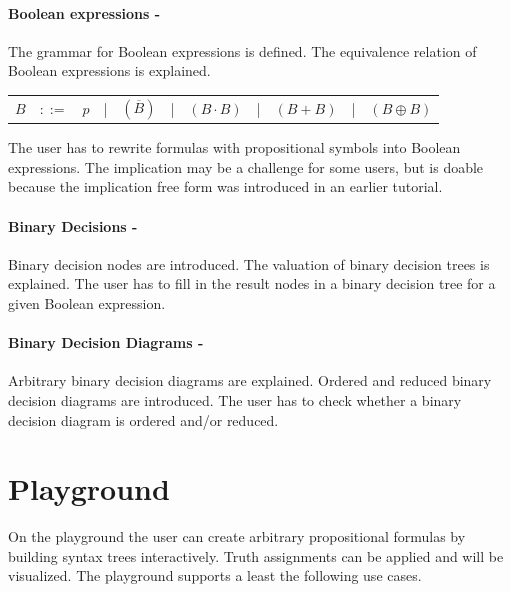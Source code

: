 \paragraph{Boolean expressions - }
\label{tut:52}
The grammar for Boolean expressions is defined. 
The equivalence relation of Boolean expressions is explained.

\begin{center}
\begin{tabular}{rcccccccccc}
$B$	&$::=$	&$p$ 	
	&|		& $(\overline{B})$ 
	&|		&  $(B \cdot B)$ 
	&|		&  $(B + B)$ 
	&|		&  $(B \oplus B)$ \\
\end{tabular}
\end{center}

The user has to rewrite formulas with propositional symbols into Boolean expressions.
The implication may be a challenge for some users, 
but is doable because the implication free form was introduced 
in an earlier tutorial.

\paragraph{Binary Decisions - }
\label{tut:53}
Binary decision nodes are introduced. 
The valuation of binary decision trees is explained.
The user has to fill in the result nodes in a binary decision tree for a given Boolean expression.

\paragraph{Binary Decision Diagrams - }
\label{tut:54}
Arbitrary binary decision diagrams are explained. 
Ordered and reduced binary decision diagrams are introduced.
The user has to check whether a binary decision diagram is ordered and/or reduced.

\section{Playground}

On the playground the user can create arbitrary propositional formulas 
by building syntax trees interactively.
Truth assignments can be applied and will be visualized.
The playground supports a least the following use cases.

